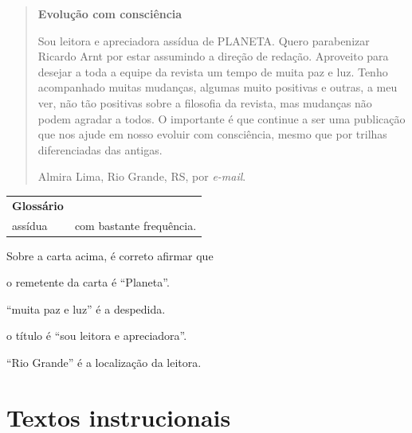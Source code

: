 
\begin{quote}
\textbf{Evolução com consciência}

Sou leitora e apreciadora assídua de PLANETA. Quero parabenizar Ricardo
Arnt por estar assumindo a direção de redação. Aproveito para desejar a
toda a equipe da revista um tempo de muita paz e luz. Tenho acompanhado
muitas mudanças, algumas muito positivas e outras, a meu ver, não tão
positivas sobre a filosofia da revista, mas mudanças não podem agradar a
todos. O importante é que continue a ser uma publicação que nos ajude em
nosso evoluir com consciência, mesmo que por trilhas diferenciadas das
antigas.

\begin{flushright}
Almira Lima, Rio Grande, RS, por \emph{e-mail}.
\end{flushright}

\end{quote}

\begin{tabular}{ll}
\textbf{Glossário} & \mbox{}\\
assídua & com bastante frequência.\\
\end{tabular}

Sobre a carta acima, é correto afirmar que 

\begin{escolha}
\item o remetente da carta é ``Planeta''.

\item ``muita paz e luz'' é a despedida.

\item o título é ``sou leitora e apreciadora''.

\item ``Rio Grande'' é a localização da leitora.
\end{escolha}



\chapter{Textos instrucionais}

\vspace*{-1cm}\enlargethispage{\baselineskip}

